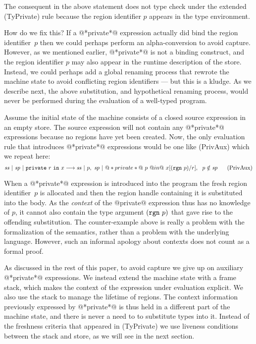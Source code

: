 The consequent in the above statement does not type check under the extended (TyPrivate) rule because the region identifier $p$ appears in the type environment.

How do we fix this? If a @*private*@ expression actually did bind the region identifier~$p$ then we could perhaps perform an alpha-conversion to avoid capture. However, as we mentioned earlier, @*private*@ is not a binding construct, and the region identifier $p$ may also appear in the runtime description of the store. Instead, we could perhaps add a global renaming process that rewrote the machine state to avoid conflicting region identifiers --- but this is a kludge. As we describe next, the above substitution, and hypothetical renaming process, would never be performed during the evaluation of a well-typed program.

Assume the initial state of the machine consists of a closed source expression in an empty store. The source expression will not contain any @*private*@ expressions because no regions have yet been created. Now, the only evaluation rule that introduces @*private*@ expressions would be one like (PrivAux) which we repeat here:
$$
\mathit{ss} ~|~ \mathit{sp} ~|~ \texttt{private}~ r~ \texttt{in}~ x \longrightarrow \mathit{ss} ~|~ p,~ \mathit{sp} ~|~ @*private*@ ~p~ @in@~ x[(\texttt{rgn}~ p)/r],
~~ p \notin \mathit{sp}
~~~~~ (\textrm{PrivAux})
$$

When a @*private*@ expression is introduced into the program the fresh region identifier~$p$ is allocated and then the region handle containing it is substituted into the body. As the \emph{context} of the @private@ expression thus has no knowledge of $p$, it cannot also contain the type argument $(\texttt{rgn}~ p)$ that gave rise to the offending substitution. The counter-example above is really a problem with the formalization of the semantics, rather than a problem with the underlying language. However, such an informal apology about contexts does not count as a formal proof.

As discussed in the rest of this paper, to avoid capture we give up on auxiliary @*private*@ expressions. We instead extend the machine state with a frame stack, which makes the context of the expression under evaluation explicit. We also use the stack to manage the lifetime of regions. The context information previously expressed by @*private*@ is thus held in a different part of the machine state, and there is never a need to to substitute types into it. Instead of the freshness criteria that appeared in (TyPrivate) we use liveness conditions between the stack and store, as we will see in the next section.


